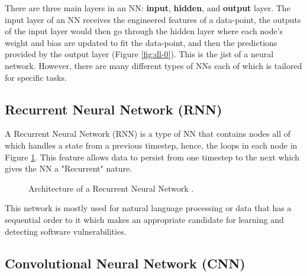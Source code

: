 \documentclass[12pt,twocolumn,letterpaper]{article}
\begin{document}
There are three main layers in an NN: \textbf{input}, \textbf{hidden}, and \textbf{output} layer. 
The input layer of an NN receives the engineered features of a data-point, the outputs of the input layer would
then go through the hidden layer where each node's weight and bias are updated to fit the data-point, and 
then the predictions provided by the output layer (Figure \ref{fig:dl-0}). This is the jist of a 
neural network. However, there are many different types of NNs each of which is tailored for specific 
tasks.

\subsection{Recurrent Neural Network (RNN)}
\label{sub:recurrent-neural-network}

A Recurrent Neural Network (RNN) is a type of NN that contains nodes all of which handles a state from a 
previous timestep, hence, the loops in each node in Figure \ref{fig:dl-1}. This feature allows data to 
persist from one timestep to the next which gives the NN a "Recurrent" nature.

\begin{figure}[h]
    \centering

    \caption{Architecture of a Recurrent Neural Network \cite{Lin20}.}
    \label{fig:dl-1}
\end{figure}

This network is mostly used for natural language processing or data that has a sequential order to it which 
makes an appropriate candidate for learning and detecting software vulnerabilities. 

\subsection{Convolutional Neural Network (CNN)}
\label{sub:convolutional-neural-network}
\end{document}
